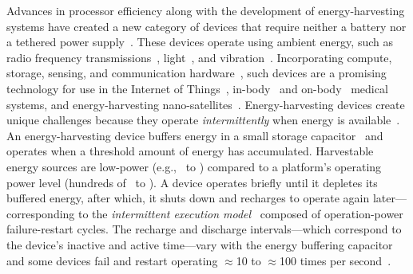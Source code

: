 Advances in processor efficiency along with the development of
energy-harvesting systems have created a new category of devices that require
neither a battery nor a tethered power
supply~\cite{prasad_comst_2014,lucia_snapl_2017,soyata_csm_2016}. These
devices operate using ambient energy, such as radio frequency
transmissions~\cite{rf_powered_computing_gollakota_2014},
light~\cite{margolies_infocom_2016,margolies_tosn_2016}, and
vibration~\cite{gorlatova_sigmetrics_2014}. Incorporating compute, storage,
sensing, and communication hardware~\cite{wisp5,moo,capybara}, such devices are a
promising technology for use in the Internet of Things~\cite{ku_cst_2016},
in-body~\cite{nadeau_naturebio_2017} and
on-body~\cite{bandodkar_electroanalysis_2015} medical systems, and
energy-harvesting nano-satellites~\cite{kicksat,capybara}.
%
Energy-harvesting devices create unique challenges because they operate {\em
intermittently} when energy is
available~\cite{hicks_isca_2017,lucia_snapl_2017}. An energy-harvesting device
buffers energy in a small storage capacitor~\cite{gorlatova_tmc_2013,gunduz_commag_2014} and operates when a
threshold amount of energy has accumulated. Harvestable energy sources are low-power (e.g., \nano\watt\ to \micro\watt) compared to a platform's operating
power level (hundreds of \micro\watt\ to \milli\watt). A device operates briefly until it depletes its buffered energy, after which, it shuts
down and recharges to operate again later---corresponding to the {\em intermittent execution model}~\cite{dino,lucia_snapl_2017} composed of
operation-power failure-restart cycles. 
The recharge and discharge intervals---which correspond to the device's inactive and active time---vary with the energy buffering capacitor~\cite{capybara}  and some devices fail and restart operating $\approx$10 to
$\approx$100 times per second~\cite{tan_infocom_2016,mementos,nvp}.
%

